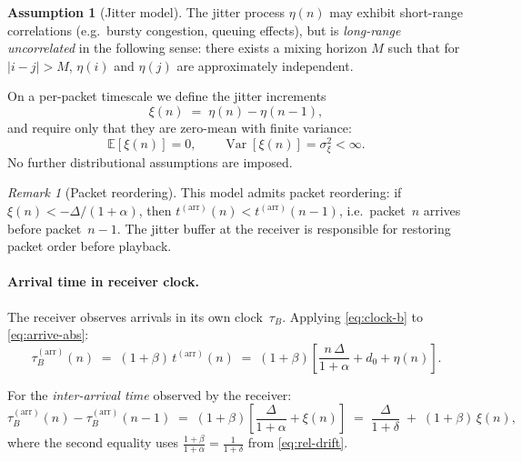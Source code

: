 \documentclass[11pt, a4paper]{article}
\theoremstyle{definition}
\newtheorem{assumption}{Assumption}[section]
\theoremstyle{plain}
\theoremstyle{remark}
\newtheorem{remark}{Remark}[section]
\newcommand{\E}{\mathbb{E}}
\newcommand{\Var}{\operatorname{Var}}
\begin{document}
\begin{assumption}[Jitter model]\label{as:jitter}
  The jitter process $\eta(n)$ may exhibit short-range correlations
  (e.g.\ bursty congestion, queuing effects), but is
  \emph{long-range uncorrelated} in the following sense:
  there exists a mixing horizon $M$ such that for $|i - j| > M$,
  $\eta(i)$ and $\eta(j)$ are approximately independent.

  On a per-packet timescale we define the jitter increments
  \begin{equation}\label{eq:jitter-inc}
    \xi(n) \;=\; \eta(n) - \eta(n-1),
  \end{equation}
  and require only that they are zero-mean with finite variance:
  \begin{equation}\label{eq:jitter-moments}
    \E[\xi(n)] = 0, \qquad
    \Var[\xi(n)] = \sigma_\xi^2 < \infty.
  \end{equation}
  No further distributional assumptions are imposed.
\end{assumption}

\begin{remark}[Packet reordering]
  This model admits packet reordering: if $\xi(n) < -\Delta/(1+\alpha)$,
  then $t^{(\text{arr})}(n) < t^{(\text{arr})}(n-1)$, i.e.\ packet~$n$
  arrives before packet~$n{-}1$.  The jitter buffer at the receiver
  is responsible for restoring packet order before playback.
\end{remark}


\paragraph{Arrival time in receiver clock.}
The receiver observes arrivals in its own clock~$\tau_B$.
Applying \eqref{eq:clock-b} to \eqref{eq:arrive-abs}:
\begin{equation}\label{eq:arrive-recv}
  \tau_B^{(\text{arr})}(n)
    \;=\; (1+\beta)\,t^{(\text{arr})}(n)
    \;=\; (1+\beta)\!\left[\frac{n\,\Delta}{1+\alpha} + d_0 + \eta(n)\right].
\end{equation}

For the \emph{inter-arrival time} observed by the receiver:
\begin{equation}\label{eq:inter-arrival}
  \tau_B^{(\text{arr})}(n) - \tau_B^{(\text{arr})}(n-1)
    \;=\; (1+\beta)\!\left[\frac{\Delta}{1+\alpha} + \xi(n)\right]
    \;=\; \frac{\Delta}{1+\delta} \;+\; (1+\beta)\,\xi(n),
\end{equation}
where the second equality uses $\frac{1+\beta}{1+\alpha} = \frac{1}{1+\delta}$
from \eqref{eq:rel-drift}.
\end{document}
